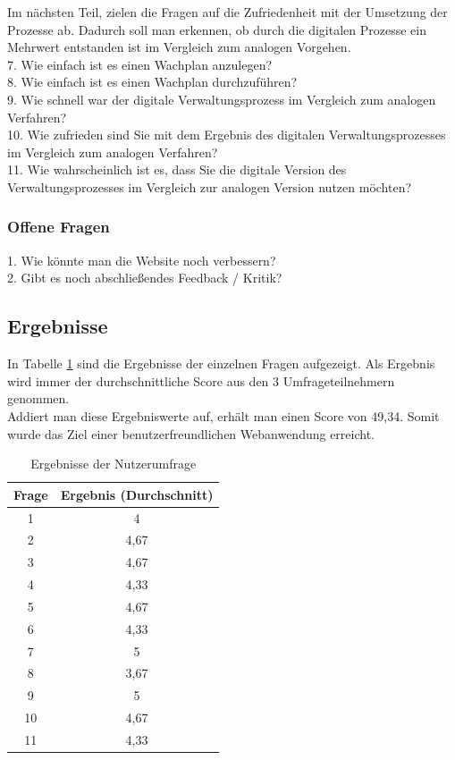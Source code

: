 \documentclass[fontsize=12pt,openright,oneside,paper=a4,BCOR=1cm]{scrbook}
\begin{document}
Im nächsten Teil, zielen die Fragen auf die Zufriedenheit mit der Umsetzung der Prozesse ab. Dadurch soll man erkennen, ob durch die digitalen Prozesse ein Mehrwert entstanden ist im Vergleich zum analogen Vorgehen.\\

7. Wie einfach ist es einen Wachplan anzulegen?\\
8. Wie einfach ist es einen Wachplan durchzuführen? \\
9. Wie schnell war der digitale Verwaltungsprozess im Vergleich zum analogen Verfahren? \\
10. Wie zufrieden sind Sie mit dem Ergebnis des digitalen Verwaltungsprozesses im Vergleich zum analogen Verfahren? \\
11. Wie wahrscheinlich ist es, dass Sie die digitale Version des Verwaltungsprozesses im Vergleich zur analogen Version nutzen möchten?\\

\subsubsection{Offene Fragen}
1. Wie könnte man die Website noch verbessern? \\
2. Gibt es noch abschließendes Feedback / Kritik?\\

\subsection{Ergebnisse}
In Tabelle \ref{tab:survey} sind die Ergebnisse der einzelnen Fragen aufgezeigt. Als Ergebnis wird immer der durchschnittliche Score aus den 3 Umfrageteilnehmern genommen. \\
Addiert man diese Ergebniswerte auf, erhält man einen Score von 49,34. Somit wurde das Ziel einer benutzerfreundlichen Webanwendung erreicht.

\begin{table}[ht]
\centering
\caption{Ergebnisse der Nutzerumfrage}
\label{tab:survey}
\begin{tabular}{|c|c|}
\hline
Frage & Ergebnis (Durchschnitt) \\
\hline
1 & 4\\
2 & 4,67\\
3 & 4,67\\
4 & 4,33\\
5 & 4,67\\
6 & 4,33\\
7 & 5\\
8 & 3,67\\
9 & 5 \\
10 & 4,67 \\
11 & 4,33 \\
\hline
\end{tabular}
\end{table}
\end{document}
